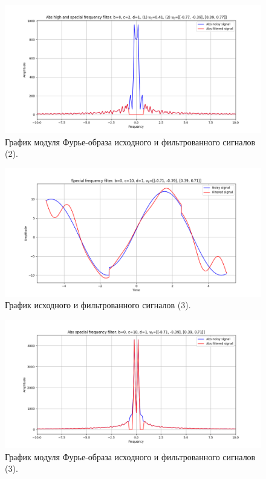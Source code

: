 \documentclass[a4paper, 12pt]{article}
\begin{document}
    \begin{figure}[!htb]
        \centering
        \includegraphics[scale=0.48]{2_4_abs_u_U_nospec.png}
        \captionsetup{skip=0pt}
        \caption{График модуля Фурье-образа исходного и фильтрованного сигналов (2).}
        \label{fig:fig90}
    \end{figure}
    \begin{figure}[!htb]
        \centering
        \includegraphics[scale=0.48]{3_u_flt_u_nospec.png}
        \captionsetup{skip=0pt}
        \caption{График исходного и фильтрованного сигналов (3).}
        \label{fig:fig91}
    \end{figure}
    \begin{figure}[!htb]
        \centering
        \includegraphics[scale=0.48]{3_abs_u_U_nospec.png}
        \captionsetup{skip=0pt}
        \caption{График модуля Фурье-образа исходного и фильтрованного сигналов (3).}
        \label{fig:fig92}
    \end{figure}
\end{document}
